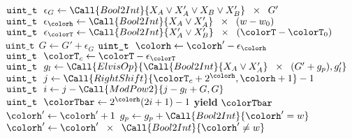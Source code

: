 \begin{algorithm}[H]
\begin{minipage}{0.55\textwidth}
\begin{algorithmic}[1]
        \Statex
        \Statex {}
        \State $\texttt{uint\_t} ~ ~ \epsilon_G \gets \Call{Bool2Int}{X_A \vee X_A' \vee X_B \vee X_B'} \;\; \times \;\; G'$ 
        \State $\texttt{uint\_t} ~ ~ \epsilon_{\colorh} \gets \Call{Bool2Int}{X_A \vee X_A'} \;\; \times \;\; (w - w_0)$
        \State $\texttt{uint\_t} ~ ~ \epsilon_{\colorT} \gets \Call{Bool2Int}{X_A' \vee X_B'} \;\; \times \;\; (\colorT - \colorT_0)$ 
        \Statex
        \State $\texttt{uint\_t} ~ ~ G \gets G' + \epsilon_G$
        \State $\texttt{uint\_t} ~ ~ \colorh \gets \colorh' - \epsilon_{\colorh}$
        \State $\texttt{uint\_t} ~ ~ \colorT_c \gets \colorT - \epsilon_{\colorT}$
        \State $\texttt{uint\_t} ~ ~ g_l \gets \Call{ElvisOp}{\Call{Bool2Int}{X_A \vee X_A'} \;\; \times \;\; (G' + g_p), g_l'}$
        \Statex
        \Statex {}
        \State $\texttt{uint\_t} ~ ~ j \gets \Call{RightShift}{\colorT_c + 2^{\colorh}, \colorh + 1} - 1$ 
        \State $\texttt{uint\_t} ~ ~ i \gets j - \Call{ModPow2}{j - g_l + G, G}$ 
        \Statex {}
        \State $\texttt{uint\_t} ~ ~ \colorTbar \gets 2^{\colorh}(2i + 1) - 1$ 
        \State \textbf{yield} $\colorTbar$
        \Statex
        \Statex {}
        \State $\colorh' \gets \colorh' + 1$ 
        \State $g_p \gets g_p + \Call{Bool2Int}{\colorh' = w}$ 
        \State $\colorh' \gets \colorh' \;\; \times \;\; \Call{Bool2Int}{\colorh' \neq w}$ 
        \EndFor
    \EndFunction
    \end{algorithmic}
\end{minipage}
\end{algorithm}
